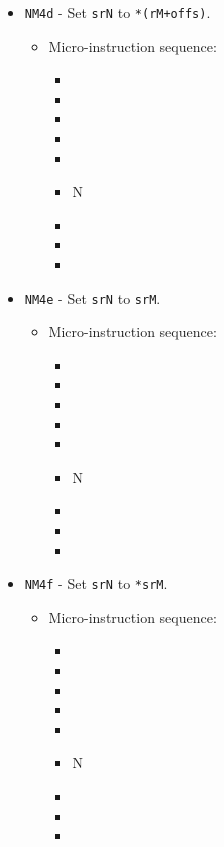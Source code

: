 \documentclass{article}
\begin{document}
\begin{itemize}
    \item \Verb|NM4d| - Set \Verb|srN| to \Verb|*(rM+offs)|.
    \begin{itemize}
        \item Micro-instruction sequence:
        \begin{itemize}
            \item \pkptroutinc
            \item \datatooffs
            \item \incrementpk
            \item \pkptroutinc
            \item \holddata
            \item \specialtoaddr N
            \item \writeRAMo
            \item \incrementpk
            \item \done
        \end{itemize}
    \end{itemize}

    \item \Verb|NM4e| - Set \Verb|srN| to \Verb|srM|.
    \begin{itemize}
        \item Micro-instruction sequence:
        \begin{itemize}
            \item \pkptroutinc
            \item \datatooffs
            \item \incrementpk
            \item \pkptroutinc
            \item \holddata
            \item \specialtoaddr N
            \item \writeRAMo
            \item \incrementpk
            \item \done
        \end{itemize}
    \end{itemize}
    
    \item \Verb|NM4f| - Set \Verb|srN| to \Verb|*srM|.
    \begin{itemize}
        \item Micro-instruction sequence:
        \begin{itemize}
            \item \pkptroutinc
            \item \datatooffs
            \item \incrementpk
            \item \pkptroutinc
            \item \holddata
            \item \specialtoaddr N
            \item \writeRAMo
            \item \incrementpk
            \item \done
        \end{itemize}
    \end{itemize}
    

\end{itemize}
\end{document}
